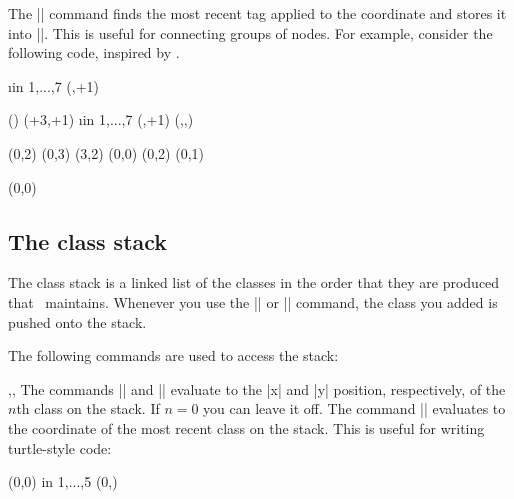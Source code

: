 \begin{sseqdata}[name = basic, cohomological Serre grading]
\begin{command}{\gettag{}}%
The |\gettag| command finds the most recent tag applied to the coordinate and
stores it into ||. This is useful for connecting groups of nodes.
For example, consider the following code, inspired by .
\begin{codeexample}[width=6cm]
\DeclareSseqCommand {} {
    \begin{scope}[#1]
    \foreach\i in {1,...,7}{
        \class(\lastx,\lasty+1)
        \structline
    }
    \end{scope}
    \restorestack
}
\DeclareSseqCommand {} {
    \begin{scope}[#1]
    \gettag\thetag(\lastclass)
    \class(\lastx+3,\lasty+1)
    \structline[gray]
    \savestack
    \foreach\i in {1,...,7}{
        \class(\lastx,\lasty+1)
        \structline
        \structline[gray](,,\thetag)
    }
    \restorestack
    \end{scope}
}
\begin{sseqpage}[ y range = {0}{6}, x tick step = 3,
    xscale=0.6, yscale=1.3 ]
\class(0,2) \class(0,3) \class(3,2)
\class[tag = h_0^i](0,0)
\tower[tag = h_0^i]
\class(0,2) \class(0,1)

\htwotower[tag = h_2 h_0^i](0,0)
\htwotower[tag = h_2 h_0^i]
\end{sseqpage}
\end{codeexample}
\end{command}


\subsection{The class stack}
\label{sec:class stack}%
The class stack is a linked list of the classes in the order that they are
produced that \sseqpages\  maintains. Whenever you use the |\class| or
|\replaceclass| command, the class you added is pushed onto the stack.

The following commands are used to access the stack:

\begin{commandlist}{\lastx{},\lasty{},\lastclass{}}%
The commands |\lastx| and |\lasty| evaluate to the |x| and |y| position,
respectively, of the $n$th class on the stack. If $n = 0$ you can leave it off.
The command |\lastclass| evaluates to the coordinate of the most recent class on
the stack. This is useful for writing turtle-style code:
\begin{codeexample}[width=6cm]
\DeclareSseqCommand {}
\DeclareSseqCommand {}
\begin{sseqpage}
\class(0,0)
\savestack
\foreach \y in { 1,...,5 }{
    \class(0,\y)
    \structline
}
\restorestack
\etaclass\etaclass\etaclass
\divtwoclass\divtwoclass
\end{sseqpage}
\end{codeexample}


\end{commandlist}
\end{sseqdata}
